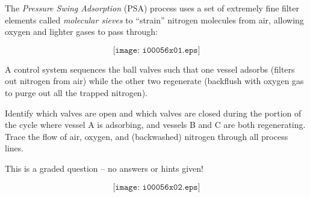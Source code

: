 

The {\it Pressure Swing Adsorption} (PSA) process uses a set of extremely fine filter elements called {\it molecular sieves} to ``strain'' nitrogen molecules from air, allowing oxygen and lighter gases to pass through:

$$\texttt{[image: i00056x01.eps]}$$

A control system sequences the ball valves such that one vessel adsorbs (filters out nitrogen from air) while the other two regenerate (backflush with oxygen gas to purge out all the trapped nitrogen).

\vskip 10pt

Identify which valves are open and which valves are closed during the portion of the cycle where vessel A is adsorbing, and vessels B and C are both regenerating.  Trace the flow of air, oxygen, and (backwashed) nitrogen through all process lines.

\vfil 

\eject






This is a graded question -- no answers or hints given!







$$\texttt{[image: i00056x02.eps]}$$




